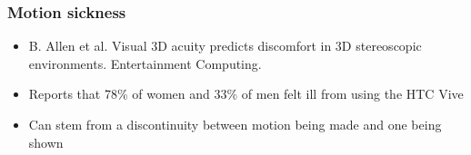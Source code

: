 \documentclass[a4paper]{article}
\begin{document}
\subsubsection{Motion sickness}
\label{sec-8-1-1}
\begin{itemize}
\item B. Allen et al. Visual 3D acuity predicts discomfort in 3D stereoscopic environments. Entertainment Computing.
\item Reports that 78\% of women and 33\% of men felt ill from using the HTC Vive
\item Can stem from a discontinuity between motion being made and one being shown
\end{itemize}
\end{document}
